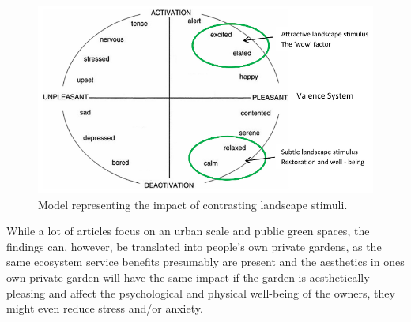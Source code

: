 	\begin{figure}[H]
		\centering
		\includegraphics[width=0.9\linewidth]{figure/Analysis/circomplexModel.png}
		\caption{Model representing the impact of contrasting landscape stimuli.\cite{wowFactor}}
		\label{fig:circumplexModel}
	\end{figure}
	
	While a lot of articles focus on an urban scale and public green spaces, the findings can, however, be translated into people's own private gardens, as the same ecosystem service benefits presumably are present and the aesthetics in ones own private garden will have the same impact if the garden is aesthetically pleasing and affect the psychological and physical well-being of the owners, they might even reduce stress and/or anxiety\cite{humanResponsesToLandscapes}.
	
